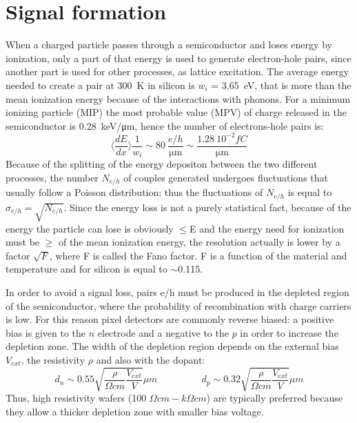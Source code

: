 \section{Signal formation}
   When a charged particle passes through a semiconductor and loses energy by ionization, only a part of that energy is used to generate electron-hole pairs, since another part is used for other processes, as lattice excitation.
   The average energy needed to create a pair at \SI{300}{K} in silicon is $w_i$ = \SI{3.65}{eV}, that is more than the mean ionization energy because of the interactions with phonons. For a minimum ionizing particle (MIP) the most probable value (MPV) of charge released in the semiconductor is \SI{0.28}{keV/\um}, hence the number of electrons-hole pairs is: 
   \begin{equation}
       \langle \frac{dE}{dx}\rangle \frac{1}{w_i} \sim 80 \: \frac{e/h}{\si{\um}} \sim \frac{1.28 \:10^{-2}\si{fC}}{\si{\um}}
   \end{equation}
   Because of the splitting of the energy depositon between the two different processes, the number $N_{e/h}$ of couples generated undergoes fluctuations that usually follow a Poisson distribution;
   thus the fluctuations of $N_{e/h}$ is equal to  $\sigma_{e/h} =\sqrt{N_{e/h}}$. Since the energy loss is not a purely statistical fact, because of the energy the particle can lose is obviously $\leqslant$E and the energy need for ionization must be $\geqslant$ of the mean ionization energy, the resolution actually is lower by a factor $\sqrt{F}$, where F is called the Fano factor. F is a function of the material and temperature and for silicon is equal to $\sim$0.115.

   In order to avoid a signal loss, pairs e/h must be produced in the depleted region of the semiconductor, where the probability of recombination with charge carriers is low.
   For this reason pixel detectors are commonly reverse biased: a positive bias is given to the $n$ electrode and a negative to the $p$ in order to increase the depletion zone. 
   The width of the depletion region depends on the external bias $V_{ext}$, the resistivity $\rho$ and also with the dopant:
   \begin{equation}
      d_{n} \sim 0.55 \sqrt{\frac{\rho}{\Omega cm}\frac{V_{ext}}{V}} \mu m 
      \hspace{55pt}
      d_{p} \sim 0.32 \sqrt{\frac{\rho}{\Omega cm}\frac{V_{ext}}{V}} \mu m
      \label{eq:deplation_d}
   \end{equation}
   Thus, high resistivity wafers (100 $\Omega cm - k\Omega cm$) are typically preferred because they allow a thicker depletion zone with smaller bias voltage. 

